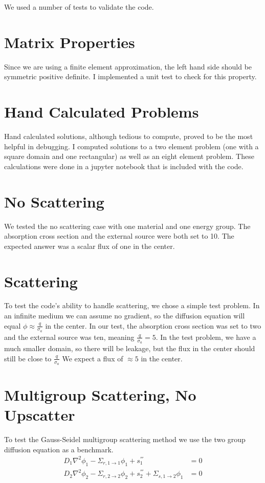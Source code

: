 We used a number of tests to validate the code. 
\section{Matrix Properties}
Since we are using a finite element approximation, the left hand side should be symmetric positive definite. I implemented a unit test to check for this property.

\section{Hand Calculated Problems}
Hand calculated solutions, although tedious to compute, proved to be the most helpful in debugging. I computed solutions to a two element problem (one with a square domain and one rectangular) as well as an eight element problem. These calculations were done in a jupyter notebook that is included with the code. 

\section{No Scattering}
We tested the no scattering case with one material and one energy group. The absorption cross section and the external source were both set to 10. The expected answer was a scalar flux of one in the center. 

\section{Scattering}
To test the code's ability to handle scattering, we chose a simple test problem.  In an infinite medium we can assume no gradient, so the diffusion equation will equal $\phi \approx \frac{q}{\sigma_a}$ in the center. In our test, the absorption cross section was set to two and the external source was ten, meaning $\frac{q}{\sigma_a} = 5$. In the test problem, we have a much smaller domain, so there will be leakage, but the flux in the center should still be close to $\frac{q}{\sigma_a}$ We expect a flux of $\approx 5$ in the center. 

\section{Multigroup Scattering, No Upscatter}
To test the Gauss-Seidel multigroup scattering method we use the two group diffusion equation as a benchmark. 
\begin{align}
 D_1\nabla^2 \phi_1 - \Sigma_{r, 1 \rightarrow 1} \phi_1 + s_1^{'''} &= 0 \\
 D_2\nabla^2 \phi_2 - \Sigma_{r, 2 \rightarrow 2} \phi_2 + s_2^{'''} + \Sigma_{s, 1 \rightarrow 2} \phi_1 &= 0
\end{align}

